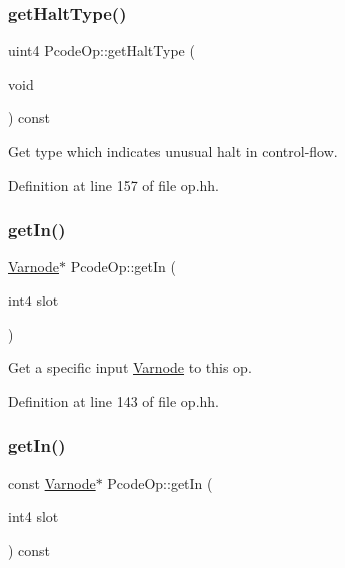\mbox{\label{class_pcode_op_af4f85b05be28b424b0dccf3646029eb9}} 
\subsubsection{\texorpdfstring{getHaltType()}{getHaltType()}}
{\footnotesize\ttfamily uint4 Pcode\+Op\+::get\+Halt\+Type (\begin{DoxyParamCaption}\item[{void}]{ }\end{DoxyParamCaption}) const\hspace{0.3cm}{\ttfamily [inline]}}



Get type which indicates unusual halt in control-\/flow. 



Definition at line 157 of file op.\+hh.

\mbox{\label{class_pcode_op_a346b81187c4eab2f5e0ced8b455c1531}} 
\subsubsection{\texorpdfstring{getIn()}{getIn()}\hspace{0.1cm}{\footnotesize\ttfamily [1/2]}}
{\footnotesize\ttfamily \mbox{\hyperlink{class_varnode}{Varnode}}$\ast$ Pcode\+Op\+::get\+In (\begin{DoxyParamCaption}\item[{int4}]{slot }\end{DoxyParamCaption})\hspace{0.3cm}{\ttfamily [inline]}}



Get a specific input \mbox{\hyperlink{class_varnode}{Varnode}} to this op. 



Definition at line 143 of file op.\+hh.

\mbox{\label{class_pcode_op_a927a386f470a9ab28cccf8c375ca3810}} 
\subsubsection{\texorpdfstring{getIn()}{getIn()}\hspace{0.1cm}{\footnotesize\ttfamily [2/2]}}
{\footnotesize\ttfamily const \mbox{\hyperlink{class_varnode}{Varnode}}$\ast$ Pcode\+Op\+::get\+In (\begin{DoxyParamCaption}\item[{int4}]{slot }\end{DoxyParamCaption}) const\hspace{0.3cm}{\ttfamily [inline]}}



